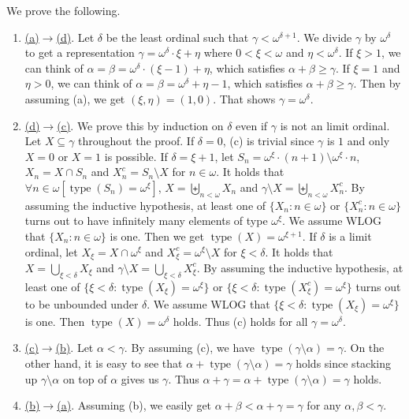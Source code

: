 \documentclass[12pt]{article}
\newcommand{\type}{\mathop{\mathrm{type}}}
\theoremstyle{definition}
\newenvironment{customthm}[1]
  {\renewcommand\theinnercustomthm{#1}\innercustomthm}
  {\endinnercustomthm}
\begin{document}
\begin{customthm}{I.9.53}
  We prove the following.
  \begin{enumerate}
    \item\underline{(a)$\rightarrow$(d)}. Let $\delta$ be the least ordinal such that $\gamma<\omega^{\delta+1}$. We divide $\gamma$ by $\omega^\delta$ to get a representation $\gamma=\omega^{\delta}\cdot\xi+\eta$ where $0<\xi<\omega$ and $\eta<\omega^\delta$. If $\xi>1$, we can think of $\alpha=\beta=\omega^\delta\cdot(\xi-1)+\eta$, which satisfies $\alpha+\beta\geq\gamma$. If $\xi=1$ and $\eta>0$, we can think of $\alpha=\beta=\omega^\delta+\eta-1$, which satisfies $\alpha+\beta\geq\gamma$. Then by assuming (a), we get $(\xi,\eta)=(1,0)$. That shows $\gamma=\omega^\delta$.
    \item\underline{(d)$\rightarrow$(c)}. We prove this by induction on $\delta$ even if $\gamma$ is not an limit ordinal. Let $X\subseteq\gamma$ throughout the proof. If $\delta=0$, (c) is trivial since $\gamma$ is $1$ and only $X=0$ or $X=1$ is possible. If $\delta=\xi+1$, let $S_n=\omega^\xi\cdot(n+1)\setminus\omega^\xi\cdot n$, $X_n=X\cap S_n$ and $X^c_n=S_n\setminus X$ for $n\in\omega$. It holds that $\forall n\in\omega[\type(S_n)=\omega^\xi]$, $X=\biguplus_{n<\omega}X_n$ and $\gamma\setminus X=\biguplus_{n<\omega}X^c_n$. By assuming the inductive hypothesis, at least one of $\{X_n:n\in\omega\}$ or $\{X^c_n:n\in\omega\}$ turns out to have infinitely many elements of type $\omega^\xi$. We assume WLOG that $\{X_n:n\in\omega\}$ is one. Then we get $\type(X)=\omega^{\xi+1}$. If $\delta$ is a limit ordinal, let $X_\xi=X\cap\omega^\xi$ and $X^c_\xi=\omega^\xi\setminus X$ for $\xi<\delta$. It holds that $X=\bigcup_{\xi<\delta}X_\xi$ and $\gamma\setminus X=\bigcup_{\xi<\delta}X^c_\xi$. By assuming the inductive hypothesis, at least one of $\{\xi<\delta:\type(X_\xi)=\omega^\xi\}$ or $\{\xi<\delta:\type(X^c_\xi)=\omega^\xi\}$ turns out to be unbounded under $\delta$. We assume WLOG that $\{\xi<\delta:\type(X_\xi)=\omega^\xi\}$ is one. Then $\type(X)=\omega^\delta$ holds. Thus (c) holds for all $\gamma=\omega^\delta$.
    \item\underline{(c)$\rightarrow$(b)}. Let $\alpha<\gamma$. By assuming (c), we have $\type(\gamma\setminus\alpha)=\gamma$. On the other hand, it is easy to see that $\alpha+\type(\gamma\setminus\alpha)=\gamma$ holds since stacking up $\gamma\setminus\alpha$ on top of $\alpha$ gives us $\gamma$. Thus $\alpha+\gamma=\alpha+\type(\gamma\setminus\alpha)=\gamma$ holds.
    \item\underline{(b)$\rightarrow$(a)}. Assuming (b), we easily get $\alpha+\beta<\alpha+\gamma=\gamma$ for any $\alpha,\beta<\gamma$.
  \end{enumerate}
\end{customthm}
\end{document}
